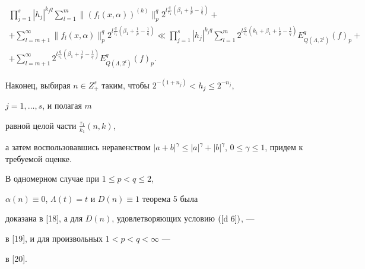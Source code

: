 \begin{pf}
\begin{multline*}
\prod_{j=1}^s |h_j|^{{k_j}q} \sum_{l=1}^{m} 


\big\|( f_l(x, \alpha ))^{(k)}\big\|^q_p


2^{l{\frac{q}{\tau_1}} (\beta_1+{\frac{1}{p}}-{\frac{1}{q}})} + \\


%


+\sum_{l=m+1}^\infty \big\|f_l(x,\alpha)\big\|_p^q 


2^{l{\frac{q}{\tau_1}} (\beta_1+{\frac{1}{p}}-{\frac{1}{q}})}\ll


\prod_{j=1}^s |h_j|^{{k_j}q} \sum_{l=1}^{m} 2^{l{\frac


{q}{\tau_1}} (k_1+\beta_1+{\frac{1}{p}}-{\frac{1}{q}})}


E^q_{Q(\Lambda,2^l)} (f)_p+ \\


%


+\sum_{l=m+1}^\infty 2^{l{\frac{q}{\tau_1}} 


(\beta_1+{\frac{1}{p}}-{\frac{1}{q}})} E^q_{Q(\Lambda,2^l)} (f)_p .


\end{multline*}


Наконец, выбирая $n\in Z^s_+$ таким, чтобы $ 2^{-(1+n_j)}<h_j\le 2^{-n_j}$,


$j=1,\dotsc,s$, и полагая $m$


равной целой части ${\frac{\tau_1}{k_1}}(n, k)$, 


а затем воспользовавшись неравенством $| a+b|^\gamma \leq |a|^\gamma +


|b|^\gamma$, $0\leq \gamma \leq 1$, придем к требуемой оценке.


\end{pf}





\begin{note}


В одномерном случае при $1\leq p<q\leq 2$, 


$\alpha(n) \equiv 0$, $\Lambda (t)=t$ и $D(n)\equiv 1$ теорема 5 была 


доказана в [18], а для $D(n)$, удовлетворяющих условию $(\ref {d 6})$, --- 


в [19], и для произвольных $1<p<q<\infty$ ---


в [20].


\end{note}





